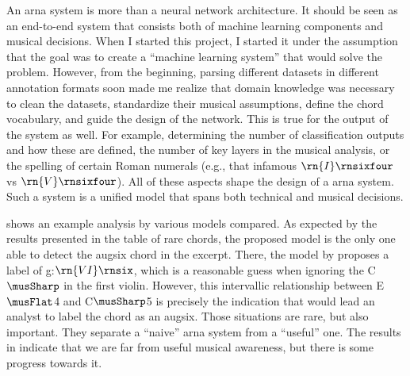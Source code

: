 
An \gls{arna} system is more than a neural network
architecture. It should be seen as an end-to-end system that
consists both of machine learning components and musical
decisions. When I started this project, I started it under
the assumption that the goal was to create a ``machine
learning system'' that would solve the problem. However,
from the beginning, parsing different datasets in different
annotation formats soon made me realize that domain
knowledge was necessary to clean the datasets, standardize
their musical assumptions, define the chord vocabulary, and
guide the design of the network. This is true for the output
of the system as well. For example, determining the number
of classification outputs and how these are defined, the
number of key layers in the musical analysis, or the
spelling of certain Roman numerals (e.g., that infamous
$\rn{I}\rnsixfour$ vs $\rn{V}\rnsixfour$). All of these
aspects shape the design of a \gls{arna} system. Such a
system is a unified model that spans both technical and
musical decisions.

 shows an example analysis by
various models compared. As expected by the results
presented in the table of rare chords, the proposed model is
the only one able to detect the \gls{augsix} chord in the
excerpt. There, the model by \textcite{mcleod2021modular}
proposes a label of g:$\rn{VI}\rnsix$, which is a reasonable
guess when ignoring the C$\musSharp$ in the first violin.
However, this intervallic relationship between E$\musFlat$4
and C$\musSharp$5 is precisely the indication that would
lead an analyst to label the chord as an \gls{augsix}. Those
situations are rare, but also important. They separate a
``naive'' \gls{arna} system from a ``useful'' one. The
results in  indicate that we are far
from useful musical awareness, but there is some progress
towards it.

